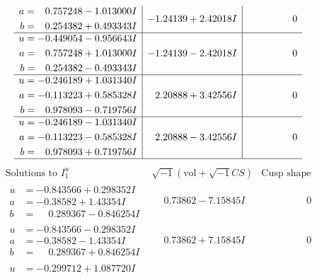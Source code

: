 \documentclass[1p]{elsarticle_modified}
\theoremstyle{definition}
\newcommand{\I}{\sqrt{-1}}
\begin{document}
$$\begin{array}{c|c|c}
\begin{aligned}
a &= \phantom{-}0.757248 - 1.013000 I \\
b &= \phantom{-}0.254382 + 0.493343 I\end{aligned}
 & -1.24139 + 2.42018 I & \phantom{-0.000000 } 0 \\ \hline\begin{aligned}
u &= -0.449054 - 0.956643 I \\
a &= \phantom{-}0.757248 + 1.013000 I \\
b &= \phantom{-}0.254382 - 0.493343 I\end{aligned}
 & -1.24139 - 2.42018 I & \phantom{-0.000000 } 0 \\ \hline\begin{aligned}
u &= -0.246189 + 1.031340 I \\
a &= -0.113223 + 0.585328 I \\
b &= \phantom{-}0.978093 - 0.719756 I\end{aligned}
 & \phantom{-}2.20888 + 3.42556 I & \phantom{-0.000000 } 0 \\ \hline\begin{aligned}
u &= -0.246189 - 1.031340 I \\
a &= -0.113223 - 0.585328 I \\
b &= \phantom{-}0.978093 + 0.719756 I\end{aligned}
 & \phantom{-}2.20888 - 3.42556 I & \phantom{-0.000000 } 0\\
 \hline 
 \end{array}$$\newpage$$\begin{array}{c|c|c}  
\text{Solutions to }I^u_{1}& \I (\text{vol} + \sqrt{-1}CS) & \text{Cusp shape}\\
 \hline 
\begin{aligned}
u &= -0.843566 + 0.298352 I \\
a &= -0.38582 + 1.43354 I \\
b &= \phantom{-}0.289367 - 0.846254 I\end{aligned}
 & \phantom{-}0.73862 - 7.15845 I & \phantom{-0.000000 } 0 \\ \hline\begin{aligned}
u &= -0.843566 - 0.298352 I \\
a &= -0.38582 - 1.43354 I \\
b &= \phantom{-}0.289367 + 0.846254 I\end{aligned}
 & \phantom{-}0.73862 + 7.15845 I & \phantom{-0.000000 } 0 \\ \hline\begin{aligned}
u &= -0.299712 + 1.087720 I \\

\end{aligned}
\end{array}$$
\end{document}

